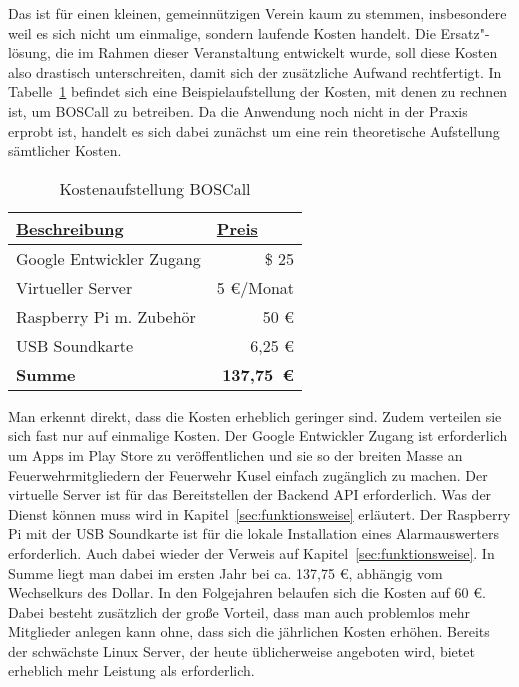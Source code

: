 Das ist für einen kleinen, gemeinnützigen Verein kaum zu stemmen, insbesondere weil es sich nicht um einmalige, sondern laufende Kosten handelt. Die Ersatz"-lösung, die im Rahmen dieser Veranstaltung entwickelt wurde, soll diese Kosten also drastisch unterschreiten, damit sich der zusätzliche Aufwand rechtfertigt. In Tabelle~\ref{tbl:BOSCallPricing} befindet sich eine Beispielaufstellung der Kosten, mit denen zu rechnen ist, um BOSCall zu betreiben. Da die Anwendung noch nicht in der Praxis erprobt ist, handelt es sich dabei zunächst um eine rein theoretische Aufstellung sämtlicher Kosten.

\begin{table}[H]
	\centering
	\caption{Kostenaufstellung BOSCall}
	\label{tbl:BOSCallPricing}
	\begin{tabular}{|l|r|}
		\hline
		{\ul \textbf{Beschreibung}} & \multicolumn{1}{l|}{{\ul \textbf{Preis}}} \\ \hline
		Google Entwickler Zugang    & \$ 25                                     \\ \hline
		Virtueller Server           & 5 €/Monat                                 \\ \hline
		Raspberry Pi m. Zubehör     & 50 €                                      \\ \hline
		USB Soundkarte              & 6,25 €                                    \\ \hline \hline
		\textbf{Summe}                  & \textbf{137,75~€}                                  \\ \hline
	\end{tabular}
\end{table}

Man erkennt direkt, dass die Kosten erheblich geringer sind. Zudem verteilen sie sich fast nur auf einmalige Kosten. Der Google Entwickler Zugang ist erforderlich um Apps im Play Store zu veröffentlichen und sie so der breiten Masse an Feuerwehrmitgliedern der Feuerwehr Kusel einfach zugänglich zu machen. Der virtuelle Server ist für das Bereitstellen der Backend API erforderlich. Was der Dienst können muss wird in Kapitel~\ref{sec:funktionsweise} erläutert.  Der Raspberry Pi mit der USB Soundkarte ist für die lokale Installation eines Alarmauswerters erforderlich. Auch dabei wieder der Verweis auf Kapitel~\ref{sec:funktionsweise}. In Summe liegt man dabei im ersten Jahr bei ca. 137,75 €, abhängig vom Wechselkurs des Dollar. In den Folgejahren belaufen sich die Kosten auf 60 €. Dabei besteht zusätzlich der große Vorteil, dass man auch problemlos mehr Mitglieder anlegen kann ohne, dass sich die jährlichen Kosten erhöhen. Bereits der schwächste Linux Server, der heute üblicherweise angeboten wird, bietet erheblich mehr Leistung als erforderlich.